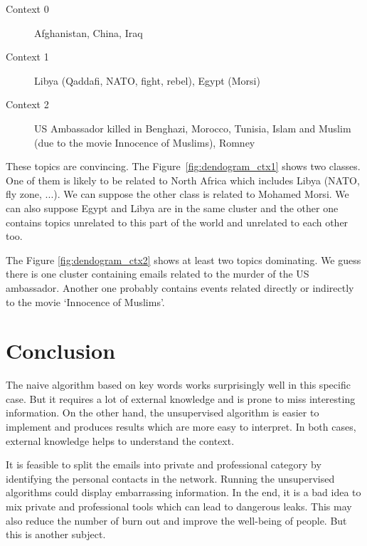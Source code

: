 \documentclass[11pt]{article}
\begin{document}
\begin{description}
    \item[Context 0] Afghanistan, China, Iraq
    \item[Context 1] Libya (Qaddafi, NATO, fight, rebel), Egypt (Morsi)
    \item[Context 2] US Ambassador killed in Benghazi, Morocco, Tunisia, Islam and Muslim (due to the movie Innocence of Muslims), Romney
\end{description}

These topics are convincing. The Figure~\ref{fig:dendogram_ctx1} shows two classes. One of them is likely to be related to North Africa which includes Libya (NATO, fly zone, ...). We can suppose the other class is related to Mohamed Morsi. We can also suppose Egypt and Libya are in the same cluster and the other one contains topics unrelated to this part of the world and unrelated to each other too.

The Figure \ref{fig:dendogram_ctx2} shows at least two topics dominating. We guess there is one cluster containing emails related to the murder of the US ambassador. Another one probably contains events related directly or indirectly to the movie `Innocence of Muslims'.

\section{Conclusion}

The naive algorithm based on key words works surprisingly well in this specific case. But it requires a lot of external knowledge and is prone to miss interesting information. On the other hand, the unsupervised algorithm is easier to implement and produces results which are more easy to interpret. In both cases, external knowledge helps to understand the context.

It is feasible to split the emails into private and professional category by identifying the personal contacts in the network. Running the unsupervised algorithms could display embarrassing information. In the end, it is a bad idea to mix private and professional tools which can lead to dangerous leaks. This may also reduce the number of burn out and improve the well-being of people. But this is another subject.
\end{document}
